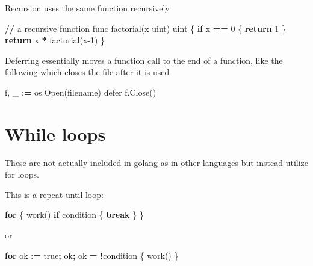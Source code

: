 \documentclass[]{book}
\newenvironment{Shaded}{\begin{snugshade}}{\end{snugshade}}
\newcommand{\ControlFlowTok}[1]{\textcolor[rgb]{0.13,0.29,0.53}{\textbf{#1}}}
\newcommand{\DecValTok}[1]{\textcolor[rgb]{0.00,0.00,0.81}{#1}}
\newcommand{\NormalTok}[1]{#1}
\newcommand{\OperatorTok}[1]{\textcolor[rgb]{0.81,0.36,0.00}{\textbf{#1}}}
\begin{document}
Recursion uses the same function recursively

\begin{Shaded}
\begin{Highlighting}[]
\OperatorTok{//}\NormalTok{ a recursive function      }
\NormalTok{func factorial(x uint) uint \{}
    \ControlFlowTok{if}\NormalTok{ x }\OperatorTok{==} \DecValTok{0}\NormalTok{ \{              }
        \ControlFlowTok{return} \DecValTok{1}             
\NormalTok{    \}                        }
    \ControlFlowTok{return}\NormalTok{ x }\OperatorTok{*}\NormalTok{ factorial(x}\DecValTok{-1}\NormalTok{)}
\NormalTok{\}      }
\end{Highlighting}
\end{Shaded}

Deferring essentially moves a function call to the end of a function, like the following which closes the file after it is used

\begin{Shaded}
\begin{Highlighting}[]
\NormalTok{f, _ :}\OperatorTok{=}\NormalTok{ os.Open(filename)}
\NormalTok{defer f.Close()}
\end{Highlighting}
\end{Shaded}

\hypertarget{while-loops}{%
\section{While loops}\label{while-loops}}

These are not actually included in golang as in other languages but instead utilize for loops.

This is a repeat-until loop:

\begin{Shaded}
\begin{Highlighting}[]
\ControlFlowTok{for}\NormalTok{ \{}
\NormalTok{    work()}
    \ControlFlowTok{if}\NormalTok{ condition \{}
        \ControlFlowTok{break}
\NormalTok{    \}}
\NormalTok{\}}
\end{Highlighting}
\end{Shaded}

or

\begin{Shaded}
\begin{Highlighting}[]
\ControlFlowTok{for}\NormalTok{ ok :}\OperatorTok{=}\NormalTok{ true}\OperatorTok{;}\NormalTok{ ok}\OperatorTok{;}\NormalTok{ ok }\OperatorTok{=} \OperatorTok{!}\NormalTok{condition \{}
\NormalTok{    work()}
\NormalTok{\}}
\end{Highlighting}
\end{Shaded}
\end{document}
